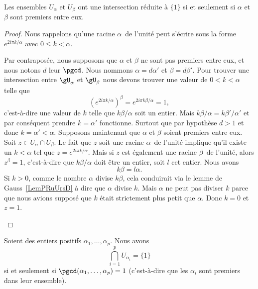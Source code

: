 \begin{proposition}      \label{PROPooIOQEooGMcCJm}
	Les ensembles \( U_{\alpha}\) et \( U_{\beta}\) ont une intersection réduite à \( \{ 1 \}\) si et seulement si \( \alpha\) et \( \beta\) sont premiers entre eux.
\end{proposition}

\begin{proof}
	Nous rappelons qu'une racine \( \alpha\)\ieme\ de l'unité peut s'écrire sous la forme \( e^{2i\pi k/\alpha}\) avec \( 0\leq k<\alpha\).
	\begin{subproof}
		Par contraposée, nous supposons que \( \alpha\) et \( \beta\) ne sont pas premiers entre eux, et nous notons \( d\) leur \( \pgcd\). Nous nommons \( \alpha=d\alpha'\) et \( \beta=d\beta'\). Pour trouver une intersection entre \( \gU_{\alpha}\) et \( \gU_{\beta}\) nous devons trouver une valeur de \( 0<k<\alpha\) telle que
		\begin{equation}
			( e^{2i\pi k/\alpha})^{\beta}= e^{2i\pi k\beta/\alpha}=1,
		\end{equation}
		c'est-à-dire une valeur de \( k\) telle que \( k\beta/\alpha\) soit un entier. Mais \( k\beta/\alpha=k\beta'/\alpha'\) et par conséquent prendre \( k=\alpha'\) fonctionne. Surtout que par hypothèse \( d>1\) et donc \( k=\alpha'<\alpha\).
		Supposons maintenant que \( \alpha\) et \( \beta \) soient premiers entre eux. Soit \( z\in U_{\alpha}\cap U_{\beta}\). Le fait que \( z\) soit une racine \( \alpha\)\ieme\ de l'unité implique qu'il existe un \( k<\alpha\) tel que \( z= e^{2i\pi k/\alpha}\). Mais si \( z\) est également une racine \( \beta\)\ieme\ de l'unité, alors \( z^{\beta}=1\), c'est-à-dire que \( k\beta/\alpha\) doit être un entier, soit \( l\) cet entier. Nous avons
		\begin{equation}
			k\beta=l\alpha.
		\end{equation}
		Si \( k>0\), comme le nombre \( \alpha\) divise \( k\beta\), cela conduirait via le lemme de Gauss~\ref{LemPRuUrsD} à dire que \( \alpha\) divise \( k\). Mais \( \alpha\) ne peut pas diviser \( k\) parce que nous avions supposé que \( k\) était strictement plus petit que \( \alpha\). Donc \( k = 0\) et \( z = 1\).
	\end{subproof}
\end{proof}

\begin{proposition}   \label{PropFDDHooEyYxBC}
	Soient des entiers positifs \( \alpha_1,\ldots, \alpha_p\). Nous avons
	\begin{equation}
		\bigcap_{i=1}^p U_{\alpha_i}=\{ 1 \}
	\end{equation}
	si et seulement si \( \pgcd(\alpha_1,\ldots, \alpha_p)=1\) (c'est-à-dire que les \( \alpha_i\) sont premiers dans leur ensemble).
\end{proposition}

